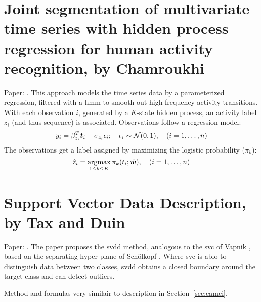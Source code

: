 \section{Joint segmentation of multivariate time series with hidden process regression for human activity recognition, by Chamroukhi}\label{sec:appendix-C-joint-segmentation}
Paper: \cite{chamroukhi2013joint}.
This approach models the time series data by a parameterized regression, filtered with a \gls{hmm} to smooth out high frequency activity transitions.
With each observation $i$, generated by a $K$-state hidden process, an activity label $z_i$ (and thus sequence) is associated.
Observations follow a regression model:
%
\begin{equation}
  y_i = \beta_{z_i}^T \vectorsym{t}_i + \sigma_{z_i} \epsilon_i; \quad \epsilon_i \sim \mathcal{N}(0,1), \quad (i=1, \dots ,n)
\end{equation}
%
The observations get a label assigned by maximizing the logistic probability ($\pi_k$):
%
\begin{equation}
  \hat{z}_i = \argmaxold \limits_{1 \leq k \leq K} \pi_k (t_i; \hat{\vectorsym{w}}), \quad (i=1, \dots, n)
\end{equation}
%






\clearpage
\section{Support Vector Data Description, by Tax and Duin}
Paper: \cite{tax2004support}.
The paper proposes the \gls{svdd} method, analogous to the \gls{svc} of Vapnik \cite{vapnik1998statistical}, based on the separating hyper-plane of Sch{\"o}lkopf \etal \cite{scholkopf1999sv}.
Where \gls{svc} is ablo to distinguish data between two classes, \gls{svdd} obtains a closed boundary around the target class and can detect outliers.

Method and formulas very similair to description in Section~\ref{sec:camci}.






\clearpage
